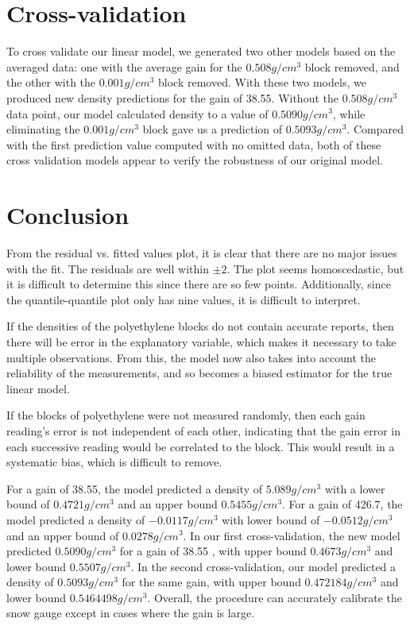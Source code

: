 \documentclass[11pt]{article} %
\begin{document}
\section*{Cross-validation}
To cross validate our linear model, we generated two other models based on the averaged data: one with the average gain for the $0.508 g/cm^3$ block removed, and the other with the $0.001 g/cm^3$ block removed. With these two models, we produced new density predictions for the gain of 38.55. Without the $0.508 g/cm^3$ data point, our model calculated density to a value of $0.5090 g/cm^3$, while eliminating the $0.001 g/cm^3$ block gave us a prediction of $0.5093 g/cm^3$. Compared with the first prediction value computed with no omitted data, both of these cross validation models appear to verify the robustness of our original model.

\section*{Conclusion}
From the residual vs. fitted values plot, it is clear that there are no major issues with the fit. The residuals are well within $\pm2$. The plot seems homoscedastic, but it is difficult to determine this since there are so few points. Additionally, since the quantile-quantile plot only has nine values, it is difficult to interpret.

If the densities of the polyethylene blocks do not contain accurate reports, then there will be error in the explanatory variable, which makes it necessary to take multiple observations. From this, the model now also takes into account the reliability of the measurements, and so becomes a biased estimator for the true linear model.

If the blocks of polyethylene were not measured randomly, then each gain reading’s error is not independent of each other, indicating that the gain error in each successive reading would be correlated to the block. This would result in a systematic bias, which is difficult to remove.

For a gain of 38.55, the model predicted a density of $5.089 g/cm^3$ with a lower bound of $0.4721 g/cm^3$ and an upper bound $0.5455 g/cm^3$. For a gain of 426.7, the model predicted a density of $-0.0117 g/cm^3$ with lower bound of $-0.0512 g/cm^3$ and an upper bound of  $0.0278 g/cm^3$. In our first cross-validation, the new model predicted $0.5090 g/cm^3$ for a gain of 38.55 , with upper bound $0.4673 g/cm^3$ and lower bound $0.5507 g/cm^3$. In the second cross-validation, our model predicted a density of $0.5093 g/cm^3$ for the same gain, with upper bound $0.472184 g/cm^3$ and lower bound $0.5464498 g/cm^3$. Overall, the procedure can accurately calibrate the snow gauge except in cases where the gain is large.
\end{document}
